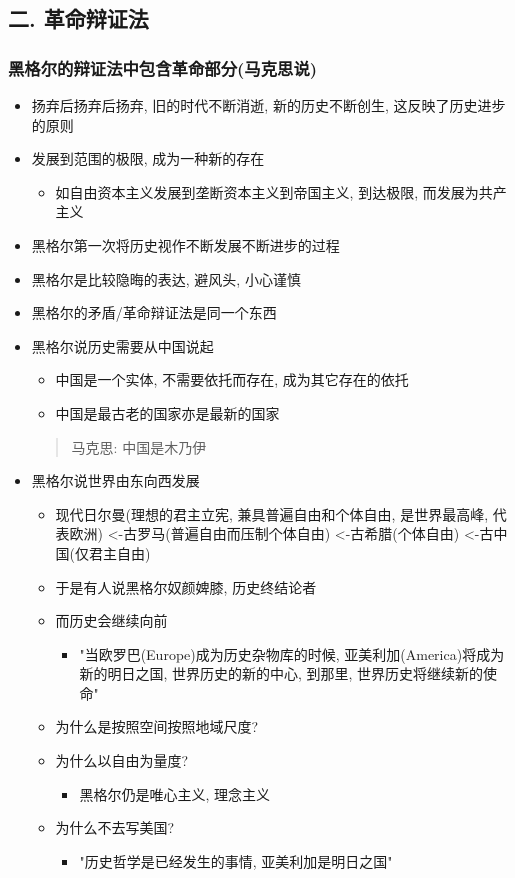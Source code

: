 \documentclass[11pt]{article}
\begin{document}
\subsection{二. 革命辩证法}
\label{sec:orgfa7d62d}
\subsubsection{黑格尔的辩证法中包含革命部分(马克思说)}
\label{sec:org9ee3127}
\begin{itemize}
\item 扬弃后扬弃后扬弃, 旧的时代不断消逝, 新的历史不断创生, 这反映了历史进步的原则
\item 发展到范围的极限, 成为一种新的存在
\begin{itemize}
\item 如自由资本主义发展到垄断资本主义到帝国主义, 到达极限, 而发展为共产主义
\end{itemize}
\item 黑格尔第一次将历史视作不断发展不断进步的过程
\item 黑格尔是比较隐晦的表达, 避风头, 小心谨慎
\item 黑格尔的矛盾/革命辩证法是同一个东西
\item 黑格尔说历史需要从中国说起
\begin{itemize}
\item 中国是一个实体, 不需要依托而存在, 成为其它存在的依托
\item 中国是最古老的国家亦是最新的国家
\end{itemize}
\begin{quote}
马克思: 中国是木乃伊
\end{quote}
\item 黑格尔说世界由东向西发展 
\begin{itemize}
\item 现代日尔曼(理想的君主立宪, 兼具普遍自由和个体自由, 是世界最高峰, 代表欧洲)
<-古罗马(普遍自由而压制个体自由)
<-古希腊(个体自由)
<-古中国(仅君主自由)
\item 于是有人说黑格尔奴颜婢膝, 历史终结论者
\item 而历史会继续向前
\begin{itemize}
\item "当欧罗巴(Europe)成为历史杂物库的时候, 亚美利加(America)将成为新的明日之国,
世界历史的新的中心, 到那里, 世界历史将继续新的使命"
\end{itemize}
\item 为什么是按照空间按照地域尺度?
\item 为什么以自由为量度?
\begin{itemize}
\item 黑格尔仍是唯心主义, 理念主义
\end{itemize}
\item 为什么不去写美国?
\begin{itemize}
\item "历史哲学是已经发生的事情, 亚美利加是明日之国"
\end{itemize}
\end{itemize}
\end{itemize}
\end{document}
